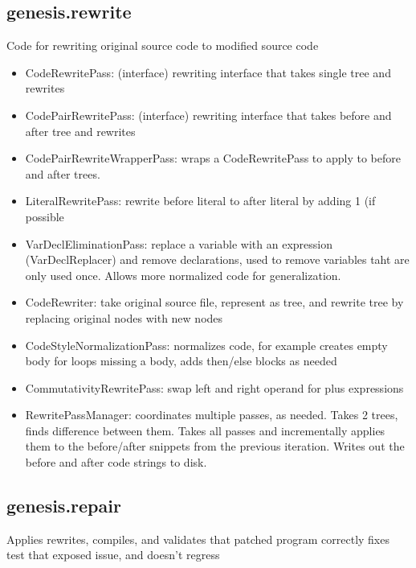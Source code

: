 \documentclass{article}
\begin{document}
\subsection{genesis.rewrite}
Code for rewriting original source code to modified source code
 
\begin{itemize} 
	\item CodeRewritePass: (interface) rewriting interface that takes single tree and rewrites
	\item CodePairRewritePass: (interface) rewriting interface that takes before and after tree and rewrites
	\item CodePairRewriteWrapperPass: wraps a CodeRewritePass to apply to before and after trees.
	\item LiteralRewritePass: rewrite before literal to after literal by adding 1 (if possible
	\item VarDeclEliminationPass: replace a variable with an expression (VarDeclReplacer) and remove declarations, used to remove variables taht are only used once. Allows more normalized code for generalization.
	\item CodeRewriter: take original source file, represent as tree, and rewrite tree by replacing original nodes with new nodes
	\item CodeStyleNormalizationPass:  normalizes code, for example creates empty body for loops missing a body, adds then/else blocks as needed
	\item CommutativityRewritePass: swap left and right operand for plus expressions
	\item RewritePassManager: coordinates multiple passes, as needed. Takes 2 trees, finds difference between them. Takes all passes and incrementally applies them to the before/after snippets from the previous iteration. Writes out the before and after code strings to disk.
\end{itemize}


\subsection{genesis.repair}
Applies rewrites, compiles, and validates that patched program correctly fixes test that exposed issue, and doesn't regress
\end{document}
